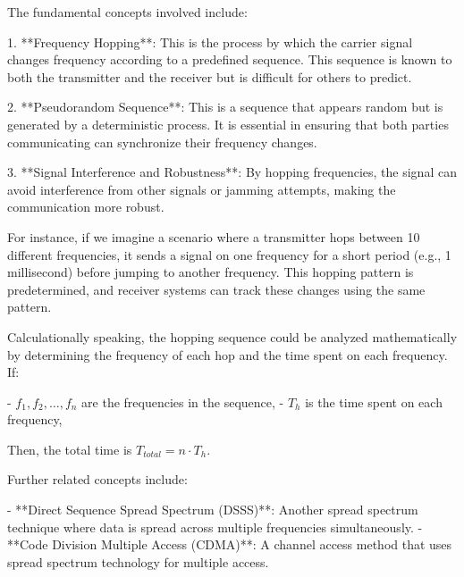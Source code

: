 The fundamental concepts involved include:

1. **Frequency Hopping**: This is the process by which the carrier signal changes frequency according to a predefined sequence. This sequence is known to both the transmitter and the receiver but is difficult for others to predict.

2. **Pseudorandom Sequence**: This is a sequence that appears random but is generated by a deterministic process. It is essential in ensuring that both parties communicating can synchronize their frequency changes.

3. **Signal Interference and Robustness**: By hopping frequencies, the signal can avoid interference from other signals or jamming attempts, making the communication more robust.

For instance, if we imagine a scenario where a transmitter hops between 10 different frequencies, it sends a signal on one frequency for a short period (e.g., 1 millisecond) before jumping to another frequency. This hopping pattern is predetermined, and receiver systems can track these changes using the same pattern.

Calculationally speaking, the hopping sequence could be analyzed mathematically by determining the frequency of each hop and the time spent on each frequency. If:

- \(f_1, f_2, \ldots, f_n\) are the frequencies in the sequence,
- \(T_h\) is the time spent on each frequency,

Then, the total time is \(T_{total} = n \cdot T_h\).

Further related concepts include:

- **Direct Sequence Spread Spectrum (DSSS)**: Another spread spectrum technique where data is spread across multiple frequencies simultaneously.
- **Code Division Multiple Access (CDMA)**: A channel access method that uses spread spectrum technology for multiple access.


